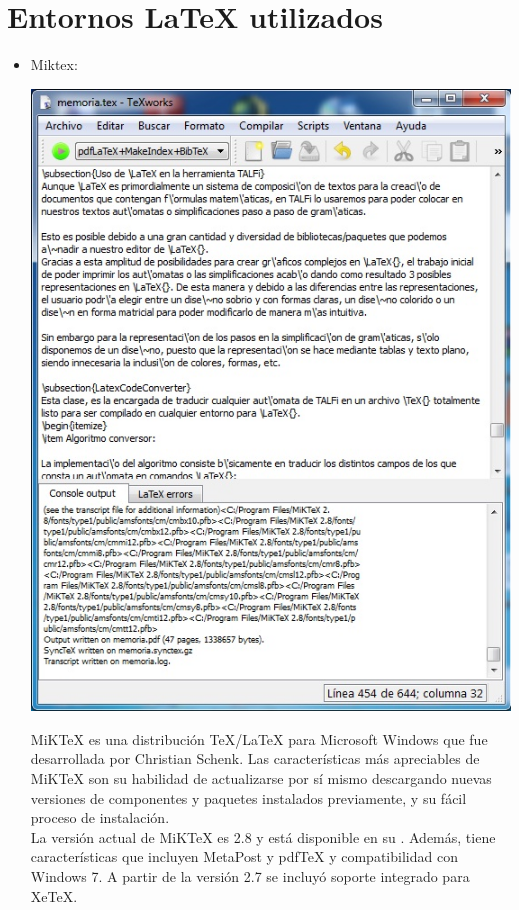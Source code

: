 \documentclass[12pt,a4paper,spanish]{book}
\begin{document}
\section{Entornos \LaTeX{} utilizados}
\begin{itemize}
\item Miktex:
\begin{center}
\includegraphics[width=\textwidth]{prog1.jpg}
\end{center}
MiKTeX es una distribuci\'on \TeX{}/\LaTeX{} para Microsoft Windows que fue desarrollada por Christian Schenk.
Las caracter\'isticas m\'as apreciables de MiKTeX son su habilidad de actualizarse por s\'i mismo descargando nuevas versiones de componentes y paquetes instalados previamente, y su f\'acil proceso de instalaci\'on.\\
La versi\'on actual de MiKTeX es 2.8 y est\'a disponible en su . Adem\'as, tiene caracter\'isticas que incluyen MetaPost y pdfTeX y compatibilidad con Windows 7. A partir de la versi\'on 2.7 se incluy\'o soporte integrado para XeTeX.


\end{itemize}
\end{document}
